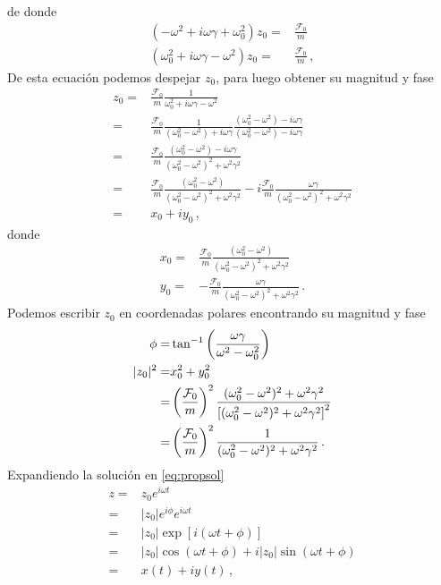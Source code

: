 de donde %
\begin{align}
  \label{eq:soluz}
  (-\omega^2+i\omega\gamma+\omega_0^2)z_0=&\frac{\mathcal{F}_0}{m}\nonumber\\
  (\omega_0^2+i\omega\gamma-\omega^2)z_0=&\frac{\mathcal{F}_0}{m}\,,
\end{align}
De esta ecuación podemos despejar $z_0$, para luego obtener su magnitud y fase
\begin{align*}
  z_0=&\frac{\mathcal{F}_0}{m}\frac{1}{\omega_0^2+i\omega\gamma-\omega^2}\nonumber\\
  =&\frac{\mathcal{F}_0}{m}\frac{1}{(\omega_0^2-\omega^2)+i\omega\gamma}
\frac{(\omega_0^2-\omega^2)-i\omega\gamma}{(\omega_0^2-\omega^2)-i\omega\gamma}\nonumber\\
  =&\frac{\mathcal{F}_0}{m}\frac{(\omega_0^2-\omega^2)-i\omega\gamma}{(\omega_0^2-\omega^2)^2+\omega^2\gamma^2}\nonumber\\
  =&\frac{\mathcal{F}_0}{m}\frac{(\omega_0^2-\omega^2)}{(\omega_0^2-\omega^2)^2+\omega^2\gamma^2}-
i\frac{\mathcal{F}_0}{m}\frac{\omega\gamma}{(\omega_0^2-\omega^2)^2+\omega^2\gamma^2}\nonumber\\
=&x_0+iy_0\,,
\end{align*}
donde
\begin{align*}
  x_0=&\frac{\mathcal{F}_0}{m}\frac{(\omega_0^2-\omega^2)}{(\omega_0^2-\omega^2)^2+\omega^2\gamma^2}\nonumber\\
  y_0=&-\frac{\mathcal{F}_0}{m}\frac{\omega\gamma}{(\omega_0^2-\omega^2)^2+\omega^2\gamma^2}\,.
\end{align*}
Podemos escribir $z_0$ en coordenadas polares encontrando su magnitud y fase
\begin{align}
  \label{eq:rphiz0}
  \phi=&\tan^{-1}\left(\frac{\omega\gamma}{\omega^2-\omega_0^2}\right)\nonumber\\
  |z_0|^2=&x_0^2+y_0^2\nonumber\\
  =&\left(\frac{\mathcal{F}_0}{m}\right)^2\frac{(\omega_0^2-\omega^2)^2+\omega^2\gamma^2}{%
    \left[(\omega_0^2-\omega^2)^2+\omega^2\gamma^2\right]^2}\nonumber\\
  =&\left(\frac{\mathcal{F}_0}{m}\right)^2\frac{1}{%
    (\omega_0^2-\omega^2)^2+\omega^2\gamma^2}\,.
\end{align}
Expandiendo la solución en \eqref{eq:propsol}
\begin{align}
  z=&z_0 e^{i\omega t}\nonumber\\
  =&|z_0|e^{i\phi}e^{i\omega t}\nonumber\\
  =&|z_0|\exp[i(\omega t +\phi)]\nonumber\\
  =&|z_0|\cos(\omega t+\phi)+i|z_0|\sin(\omega t+\phi)\nonumber\\
  =&x(t)+iy(t)\,,
\end{align}

